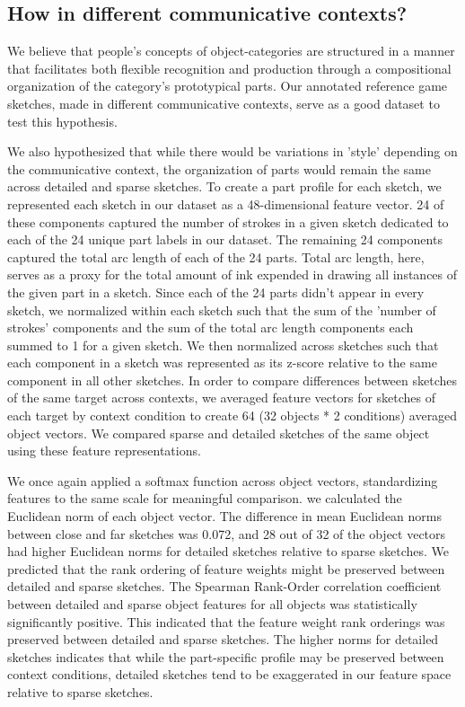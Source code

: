 \documentclass[10pt,letterpaper]{article}
\begin{document}
\subsection{How in different communicative contexts?}





We believe that people's concepts of object-categories are structured in a manner that facilitates both flexible recognition and production through a compositional organization of the category's prototypical parts. Our annotated reference game sketches, made in different communicative contexts, serve as a good dataset to test this hypothesis.

We also hypothesized that while there would be variations in 'style' depending on the communicative context, the organization of parts would remain the same across detailed and sparse sketches. To create a part profile for each sketch, we represented each sketch in our dataset as a 48-dimensional feature vector. 
24 of these components captured the number of strokes in a given sketch dedicated to each of the 24 unique part labels in our dataset. The remaining 24 components captured the total arc length of each of the 24 parts. Total arc length, here, serves as a proxy for the total amount of ink expended in drawing all instances of the given part in a sketch. Since each of the 24 parts didn't appear in every sketch, we normalized within each sketch such that the sum of the 'number of strokes' components and the sum of the total arc length components each summed to 1 for a given sketch. We then normalized across sketches such that each component in a sketch was represented as its z-score relative to the same component in all other sketches. 
In order to compare differences between sketches of the same target across contexts, we averaged feature vectors for sketches of each target by context condition to create 64 (32 objects * 2 conditions) averaged object vectors.
We compared sparse and detailed sketches of the same object using these feature representations. 



We once again applied a softmax function across object vectors, standardizing features to the same scale for meaningful comparison.
we calculated the Euclidean norm of each object vector. The difference in mean Euclidean norms between close and far sketches was 0.072, and 28 out of 32 of the object vectors had higher Euclidean norms for detailed sketches relative to sparse sketches. We predicted that the rank ordering of feature weights might be preserved between detailed and sparse sketches. The Spearman Rank-Order correlation coefficient between detailed and sparse object features for all objects was statistically significantly positive. This indicated that the feature weight rank orderings was preserved between detailed and sparse sketches. The higher norms for detailed sketches indicates that while the part-specific profile may be preserved between context conditions, detailed sketches tend to be exaggerated in our feature space relative to sparse sketches.
\end{document}
